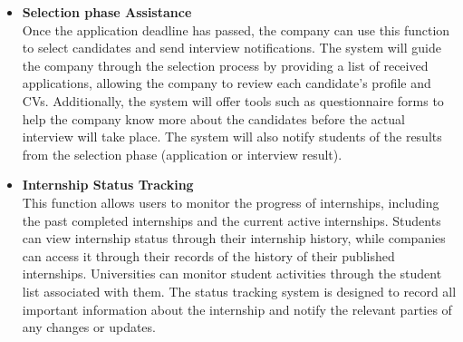 \begin{itemize}[label={ }]
    \item \textcolor{bluepoli}{\textbf{Selection phase Assistance}}
    \\Once the application deadline has passed, the company can use this function to select candidates and send interview notifications. The system will 
    guide the company through the selection process by providing a list of received applications, allowing the company to review each candidate's profile 
    and CVs. Additionally, the system will offer tools such as questionnaire forms to help the company know more about the candidates before the actual 
    interview will take place. The system will also notify students of the results from the selection phase (application or interview result).

    \item \textcolor{bluepoli}{\textbf{Internship Status Tracking}}
    \\This function allows users to monitor the progress of internships, including the past completed internships and the current active internships.
    Students can view internship status through their internship history, while companies can access it through their records of the history of their 
    published internships. Universities can monitor student activities through the student list associated with them. The status tracking system
    is designed to record all important information about the internship and notify the relevant parties of any changes or updates.


\end{itemize}
